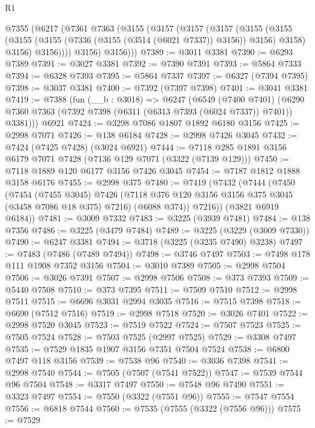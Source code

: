 \begin{lexlean}{R1}
\begin{coremodule}
    @7355
      (@6217
        (@7361
          @7363
          (@3155
            (@3157
              (@3157
                (@3157
                  (@3155
                    (@3155
                      (@3155 (@3155 (@7336 (@3155 (@3514 (@6021 @7337)) @3156)) @3156) @3158)
                      @3156)
                    @3156))))
            @3156)
          @3156)))
@7389 := @3011 @3381
@7390 := @6293 @7389
@7391 := @3027 @3381
@7392 := @7390 @7391
@7393 := @5864 @7333
@7394 := @6328 @7393
@7395 := @5864 @7337
@7397 := @6327 (@7394 @7395)
@7398 := @3037 @3381
@7400 := @7392 (@7397 @7398)
@7401 := @3041 @3381
@7419 := @7388
    (fun (__b : @3018) =>
    @6247
      (@6549
        (@7400 @7401)
        (@6290 @7360 @7363 (@7392 @7398 (@6311 (@6313 @7393 (@6024 @7337)) @7401)) @3381)))
    @6921
@7424 := @3298 @7086 @1807 @1892 @6180 @3156
@7425 := @2998 @7071
@7426 := @138 @6184
@7428 := @2998 @7426 @3045
@7432 := @7424 (@7425 @7428) (@3024 @6921)
@7444 := @7118 @285 @1891 @3156 @6179 @7071 @7428 (@7136 @129 @7071 (@3322 (@7139 @129)))
@7450 := @7118 @1889 @120 @6177 @3156 @7426 @3045
@7454 := @7187 @1812 @1888 @3158 @6176
@7455 := @2998 @375
@7480 := @7419
    (@7432
      (@7444
        (@7450
          (@7454
            (@7455 @3045)
            @7426
            (@7118 @376 @120 @3156 @3156 @375 @3045 (@3458 @7086 @18 @375) @7216)
            (@6088 @374))
          @7216))
      (@3821 @6919 @6184))
@7481 := @3009 @7332
@7483 := @3225 (@3939 @7481)
@7484 := @138 @7356
@7486 := @3225 (@3479 @7484)
@7489 := @3225 (@3229 (@3009 @7330))
@7490 := @6247 @3381
@7494 := @3718 (@3225 (@3235 @7490) @3238)
@7497 := @7483 (@7486 (@7489 @7494))
@7498 := @3746 @7497
@7503 := @7498 @178 @111 @1908 @7352 @3156
@7504 := @3010 @7389
@7505 := @2998 @7504
@7506 := @3026 @7391
@7507 := @2998 @7506
@7508 := @373 @7393
@7509 := @5440 @7508
@7510 := @373 @7395
@7511 := @7509 @7510
@7512 := @2998 @7511
@7515 := @6696 @3031 @2994 @3035
@7516 := @7515 @7398
@7518 := @6690 (@7512 @7516)
@7519 := @2998 @7518
@7520 := @3026 @7401
@7522 := @2998 @7520 @3045
@7523 := @7519 @7522
@7524 := @7507 @7523
@7525 := @7505 @7524
@7528 := @7503 @7525 (@2997 @7525)
@7529 := @3308 @7497
@7535 := @7529 @1835 @1907 @3156 @7351 @7504 @7524
@7538 := @6800 @7497 @118 @3156
@7539 := @7538 @96
@7540 := @3036 @7398
@7541 := @2998 @7540
@7544 := @7505 (@7507 (@7541 @7522))
@7547 := @7539 @7544 @96 @7504
@7548 := @3317 @7497
@7550 := @7548 @96 @7490
@7551 := @3323 @7497
@7554 := @7550 (@3322 (@7551 @96))
@7555 := @7547 @7554
@7556 := @6818 @7544
@7560 := @7535 (@7555 (@3322 (@7556 @96)))
@7575 := @7529

\end{coremodule}
\end{lexlean}
